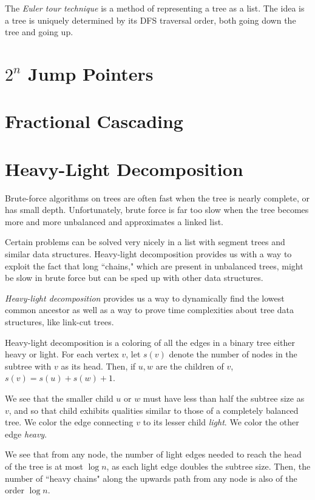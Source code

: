 \documentclass[11pt]{book}
\begin{document}
The \textit{Euler tour technique} is a method of representing a tree as a list. The idea is a tree is uniquely determined by its DFS traversal order, both going down the tree and going up.

\section{$2^n$ Jump Pointers}

\section{Fractional Cascading}

\section{Heavy-Light Decomposition}

Brute-force algorithms on trees are often fast when the tree is nearly complete, or has small depth. Unfortunately, brute force is far too slow when the tree becomes more and more unbalanced and approximates a linked list.

Certain problems can be solved very nicely in a list with segment trees and similar data structures. Heavy-light decomposition provides us with a way to exploit the fact that long ``chains," which are present in unbalanced trees, might be slow in brute force but can be sped up with other data structures.

\textit{Heavy-light decomposition} provides us a way to dynamically find the lowest common ancestor as well as a way to prove time complexities about tree data structures, like link-cut trees. 

Heavy-light decomposition is a coloring of all the edges in a binary tree either heavy or light. For each vertex $v$, let $s(v)$ denote the number of nodes in the subtree with $v$ as its head. Then, if $u,w$ are the children of $v$, $s(v)=s(u)+s(w)+1$.

We see that the smaller child $u$ or $w$ must have less than half the subtree size as $v$, and so that child exhibits qualities similar to those of a completely balanced tree. We color the edge connecting $v$ to its lesser child \textit{light}. We color the other edge \textit{heavy}.

We see that from any node, the number of light edges needed to reach the head of the tree is at most $\log{n}$, as each light edge doubles the subtree size. Then, the number of ``heavy chains" along the upwards path from any node is also of the order $\log{n}$.
\end{document}
